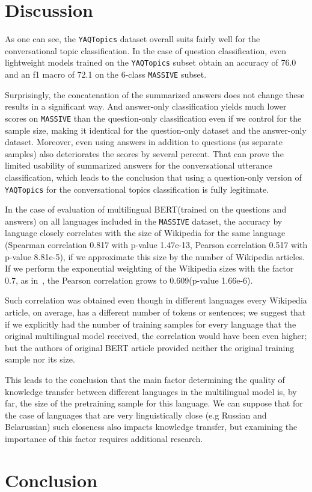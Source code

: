 \section{Discussion} 
As one can see, the \texttt{YAQTopics} dataset overall suits fairly well for the conversational topic classification. In the case of question classification, even lightweight models trained on the \texttt{YAQTopics} subset obtain an accuracy of 76.0 and an f1 macro of 72.1 on the 6-class \texttt{MASSIVE} subset.

 Surprisingly, the concatenation of the summarized answers does not change these results in a significant way. And answer-only classification yields much lower scores on \texttt{MASSIVE} than the question-only classification even if we control for the sample size, making it identical for the question-only dataset and the answer-only dataset. Moreover, even using answers in addition to questions (as separate samples) also deteriorates the scores by several percent. That can prove the limited usability of summarized answers for the conversational utterance classification, which leads to the conclusion that using a question-only version of \texttt{YAQTopics} for the conversational topics classification is fully legitimate.

In the case of evaluation of multilingual BERT(trained on the questions and answers) on all languages included in the \texttt{MASSIVE} dataset, the accuracy by language closely correlates with the size of Wikipedia for the same language (Spearman correlation 0.817 with p-value 1.47e-13, Pearson correlation 0.517 with p-value 8.81e-5), if we approximate this size by the number of Wikipedia articles. If we perform the exponential weighting of the Wikipedia sizes with the factor 0.7, as in~\cite{bert}, the Pearson correlation grows to 0.609(p-value 1.66e-6).

 Such correlation was obtained even though in different languages every Wikipedia article, on average, has a different number of tokens or sentences; we suggest that if we explicitly had the number of training samples for every language that the original multilingual model received, the correlation would have been even higher; but the authors of original BERT article provided neither the original training sample nor its size. 

This leads to the conclusion that the main factor determining the quality of knowledge transfer between different languages in the multilingual model is, by far, the size of the pretraining sample for this language. We can suppose that for the case of languages that are very linguistically close (e.g Russian and Belarussian) such closeness also impacts knowledge transfer, but examining the importance of this factor requires additional research. 


\section{Conclusion} 

